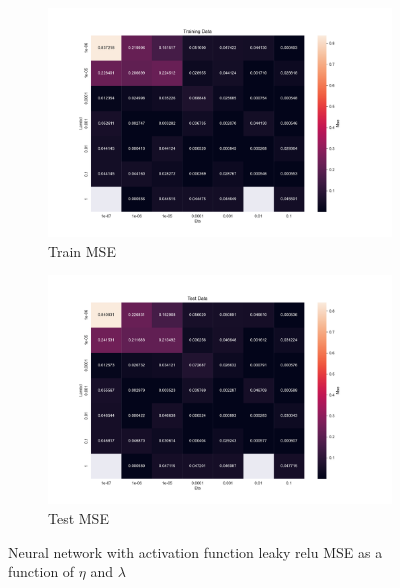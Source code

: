 \begin{figure}[htpb]
\begin{subfigure}{.5\textwidth}
  \centering
  \includegraphics[width=1.2\linewidth]{Figures/PartB/train_leaky_relu_MSE(eta,lmb)}
  \caption{Train MSE}
  \label{fig:train_leaky_relu_MSE-eta-lmb-}
\end{subfigure}%
\begin{subfigure}{.5\textwidth}
  \centering
  \includegraphics[width=1.2\linewidth]{Figures/PartB/test_leaky_relu_MSE(eta,lmb)}
  \caption{Test MSE}
  \label{fig:test_leaky_relu_MSE-eta-lmb-}
\end{subfigure}
\caption{Neural network with activation function leaky relu MSE as a function of \(\eta \) and \(\lambda \) }
\label{fig:leaky_relu_MSE}
\end{figure}


